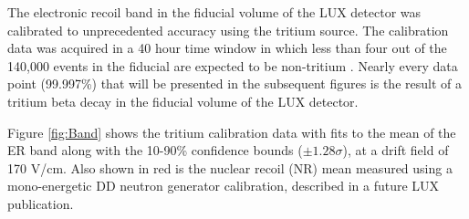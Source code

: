 The electronic recoil band in the fiducial volume of the LUX detector was calibrated to unprecedented accuracy using the tritium source. The calibration data was acquired in a 40 hour time window in which less than four out of the 140,000 events in the fiducial are expected to be non-tritium \cite{LUX_BG}.  Nearly every data point (99.997\%) that will be presented in the subsequent figures is the result of a tritium beta decay in the fiducial volume of the LUX detector. 

Figure \ref{fig:Band} shows the tritium calibration data with fits to the mean of the ER band along with the 10-90\% confidence bounds ($\pm 1.28\sigma$), at a drift field of 170 V/cm. Also shown in red is the nuclear recoil (NR) mean measured using a mono-energetic DD neutron generator calibration, described in a future LUX publication.


